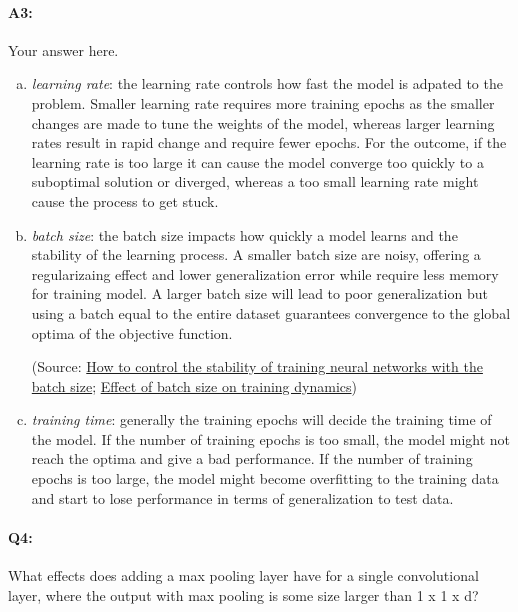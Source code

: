 \paragraph{A3:} Your answer here.

\begin{enumerate}[(a)]

    \item \emph{learning rate}: the learning rate controls how fast the model is adpated to the problem. Smaller learning rate requires more training epochs as the smaller changes are made to tune the weights of the model, whereas larger learning rates result in rapid change and require fewer epochs. For the outcome, if the learning rate is too large it can cause the model converge too quickly to a suboptimal solution or diverged, whereas a too small learning rate might cause the process to get stuck.

    \item \emph{batch size}: the batch size impacts how quickly a model learns and the stability of the learning process. A smaller batch size are noisy, offering a regularizaing effect and lower generalization error while require less memory for training model. A larger batch size will lead to poor generalization but using a batch equal to the entire dataset guarantees convergence to the global optima of the objective function.

          (Source: \href{https://machinelearningmastery.com/how-to-control-the-speed-and-stability-of-training-neural-networks-with-gradient-descent-batch-size/}{How to control the stability of training neural networks with the batch size}; \href{https://medium.com/mini-distill/effect-of-batch-size-on-training-dynamics-21c14f7a716e}{Effect of batch size on training dynamics})
    \item \emph{training time}: generally the training epochs will decide the training time of the model. If the number of training epochs is too small, the model might not reach the optima and give a bad performance. If the number of training epochs is too large, the model might become overfitting to the training data and start to lose performance in terms of generalization to test data.

\end{enumerate}


\pagebreak
\paragraph{Q4:} What effects does adding a max pooling layer have for a single convolutional layer, where the output with max pooling is some size larger than 1 x 1 x d?

